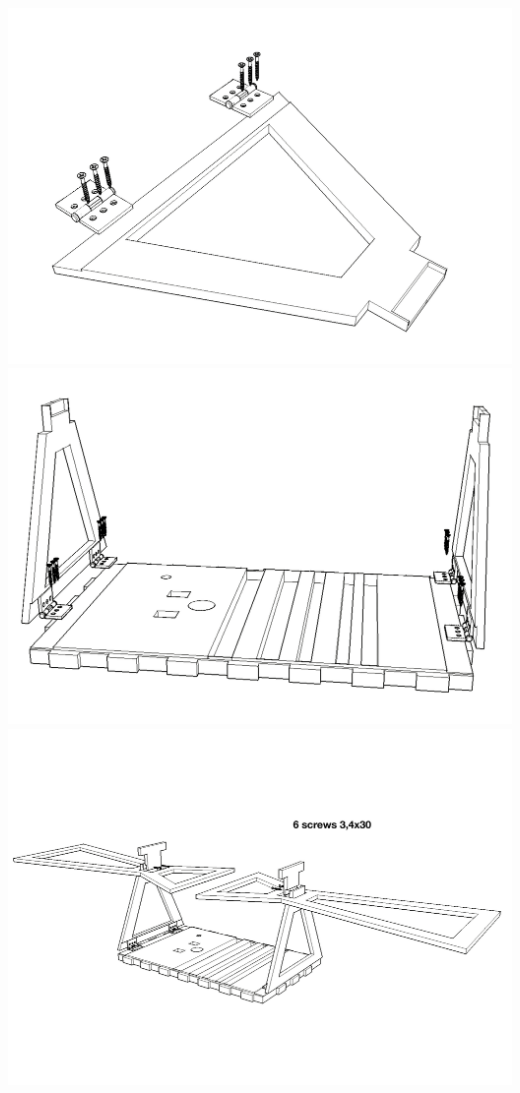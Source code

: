 \documentclass{article}
\begin{document}
\begin{center}
	\includegraphics[width=\hsize]{assembling/step1.png}
	\includegraphics[width=\hsize]{assembling/step2.png}
	\includegraphics[width=\hsize]{assembling/step3.png}

\end{center}
\end{document}
